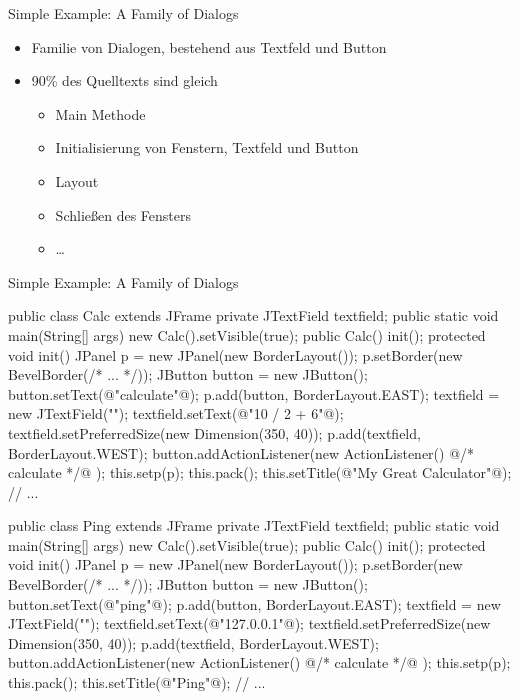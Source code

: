 \begin{frame}{Simple Example: A Family of Dialogs}
	\begin{itemize}
		\item Familie von Dialogen, bestehend aus Textfeld und Button\\
		\item 90\% des Quelltexts sind gleich
		\begin{itemize}
			\item Main Methode
			\item Initialisierung von Fenstern, Textfeld und Button
			\item Layout
			\item Schließen des Fensters
			\item \ldots
		\end{itemize}
	\end{itemize}
\end{frame}


\begin{frame}[fragile]{Simple Example: A Family of Dialogs}
	\small\begin{mycolumns}[columns=2,widths={50,50}]
\begin{codetight}{}
public class Calc extends JFrame {
	private JTextField textfield;
	public static void main(String[] args) {
		new Calc().setVisible(true);
	}
	public Calc() { init(); }
	protected void init() {
		JPanel p = new JPanel(new BorderLayout());
		p.setBorder(new BevelBorder(/* ... */));
		JButton button = new JButton();
		button.setText(@"calculate"@);
		p.add(button, BorderLayout.EAST);
		textfield = new JTextField("");
		textfield.setText(@"10 / 2 + 6"@);
		textfield.setPreferredSize(new Dimension(350, 40));
		p.add(textfield, BorderLayout.WEST);
		button.addActionListener(new ActionListener() 
			{ @/* calculate */@ });
		this.setp(p);
		this.pack();
		this.setTitle(@"My Great Calculator"@);
		// ...
	}
}
\end{codetight}
		\mynextcolumn
\begin{codetight}{}
public class Ping extends JFrame {
	private JTextField textfield;
	public static void main(String[] args) {
		new Calc().setVisible(true);
	}
	public Calc() { init(); }
	protected void init() {
		JPanel p = new JPanel(new BorderLayout());
		p.setBorder(new BevelBorder(/* ... */));
		JButton button = new JButton();
		button.setText(@"ping"@);
		p.add(button, BorderLayout.EAST);
		textfield = new JTextField("");
		textfield.setText(@"127.0.0.1"@);
		textfield.setPreferredSize(new Dimension(350, 40));
		p.add(textfield, BorderLayout.WEST);
		button.addActionListener(new ActionListener() 
			{ @/* calculate */@ });
		this.setp(p);
		this.pack();	
		this.setTitle(@"Ping"@);
		// ...
	}
}
\end{codetight}
	\end{mycolumns}
\end{frame}


